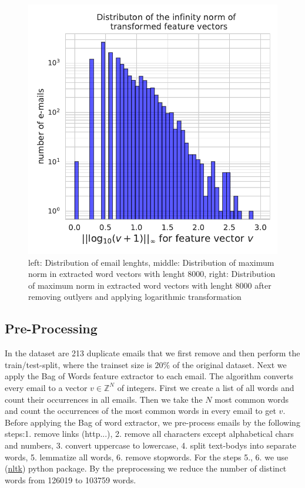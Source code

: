 \documentclass[11pt]{article}
\begin{document}
\begin{figure}
\begin{minipage}[t]{0.3\textwidth}
\end{minipage}
\begin{minipage}[t]{0.3\textwidth}
\includegraphics[width=1\linewidth]{email_spam/word_transformed_count.pdf}
\end{minipage}
   \caption{left: Distribution of email lenghts, middle: Distribution of maximum norm in extracted word vectors with lenght 8000, right: Distribution of maximum norm in extracted word vectors with lenght 8000 after removing outlyers and applying logarithmic transformation}
\label{spamfig_fig0}
\end{figure}

\subsection{Pre-Processing}
In the dataset are 213 duplicate emails that we first remove and then perform the train/test-split, where the trainset size is $20\%$ of the original dataset. Next we apply the Bag of Words feature extractor to each email. The algorithm converts every email to a vector $v\in\mathbb{Z}^N$ of integers. First we create a list of all words and count their occurrences in all emails. Then we take the $N$ most common words and count the occurrences of the most common words in every email to get $v$. Before applying the Bag of word extractor, we pre-process emails by the following steps:1. remove links (http...), 2. remove all characters except alphabetical chars and numbers, 3. convert uppercase to lowercase, 4. split text-bodys into separate words, 5. lemmatize all words, 6. remove stopwords. For the steps 5., 6. we use (\href{https://www.nltk.org/}{nltk}) python package. By the preprocessing we reduce the number of distinct words from 126019 to 103759 words. 
\end{document}
